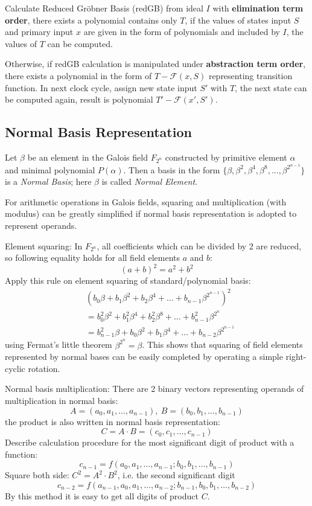 Calculate Reduced Gr\"obner Basis (redGB) from ideal $I$ with \textbf{elimination term order}, there exists a polynomial contains
only $T$, if the values of states input $S$ and primary input $x$ are given in the form of polynomials and included by $I$,
the values of $T$ can be computed.

Otherwise, if redGB calculation is manipulated under \textbf{abstraction term order}, there exists a polynomial in
the form of $T - \mathcal{F}(x, S)$ representing transition function. In next clock cycle, assign new state input $S'$ with $T$, the next
state can be computed again, result is polynomial $T' - \mathcal{F}(x', S')$. 

\subsection{Normal Basis Representation}

Let $\beta$ be an element in the Galois field $F_{2^n}$ constructed by primitive element $\alpha$ and minimal polynomial
$P(\alpha)$. Then a basis in the form $\{\beta, \beta^2, \beta^4, \beta^8, ... ,\beta^{2^{n-1}}\}$ is a
\emph{Normal Basis}; here $\beta$ is called \emph{Normal Element}.

For arithmetic operations in Galois fields, squaring and multiplication (with modulus) can be greatly simplified if 
normal basis representation is adopted to represent operands.
\begin{Example}
\label{ex:nb_sq}
Element squaring: In $F_{2^n}$, all coefficients which can be divided by 2 are reduced, so 
following equality holds for all field elements $a$ and $b$:
$$(a+b)^2 = a^2 + b^2$$ 
Apply this rule on element squaring of standard/polynomial basis:
\begin{align}
& (b_0\beta + b_1\beta^2 + b_2\beta^4 + \dots + b_{n-1}\beta^{2^{n-1}})^2 \nonumber\\
&= b_0^2\beta^2 + b_1^2\beta^4 + b_2^2\beta^8 + \dots + b_{n-1}^2\beta^{2^n} \nonumber\\
&= b_{n-1}^2\beta + b_0\beta^2 + b_1\beta^4 + \dots + b_{n-2}\beta^{2^{n-1}} \nonumber
\end{align}
using Fermat's little theorem $\beta^{2^n} = \beta$. This shows that squaring of field elements
represented by normal bases can be easily completed by operating a simple right-cyclic rotation.
\end{Example}

\begin{Example}
\label{ex:onb_multi}
Normal basis multiplication: There are 2 binary vectors representing operands of multiplication in normal
basis: $$A = (a_0, a_1, \dots, a_{n-1}),\ B = (b_0, b_1, \dots, b_{n-1})$$ 
the product is also written in normal basis representation: $$C = A\cdot B = (c_0, c_1, \dots, c_{n-1})$$
Describe calculation procedure for the most significant digit of product with a function: 
$$c_{n-1} = f(a_0, a_1, \dots, a_{n-1}; b_0, b_1, \dots, b_{n-1})$$
Square both side: $C^2 = A^2\cdot B^2$, i.e. the second significant digit 
$$c_{n-2} = f(a_{n-1}, a_0, a_1, \dots, a_{n-2}; b_{n-1}, b_0, b_1, \dots, b_{n-2})$$ 
By this method it is easy to get all digits of product $C$.
\end{Example}
  

